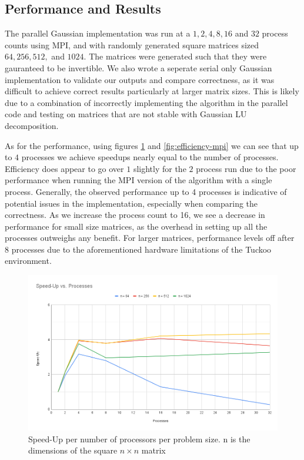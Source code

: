 \documentclass[12pt,letterpaper]{article}
\begin{document}
\subsection{Performance and Results}
    The parallel Gaussian implementation was run at a \(1, 2, 4, 8, 16\) and \(32\) process counts using MPI, and with randomly generated square matrices sized \(64, 256, 512,\) and \(1024\). The matrices were generated such that they were gauranteed to be invertible. We also wrote a seperate serial only Gaussian implementation to validate our outputs and compare correctness, as it was difficult to achieve correct results particularly at larger matrix sizes. This is likely due to a combination of incorrectly implementing the algorithm in the parallel code and testing on matrices that are not stable with Gaussian LU decomposition.
\par
    As for the performance, using figures \ref{fig:speed-up-mpi} and \ref{fig:efficiency-mpi} we can see that up to \(4\) processes we achieve speedups nearly equal to the number of processes. Efficiency does appear to go over \(1\) slightly for the \(2\) process run due to the poor performance when running the MPI version of the algorithm with a single process. Generally, the observed performance up to 4 processes is indicative of potential issues in the implementation, especially when comparing the correctness. As we increase the process count to 16, we see a decrease in performance for small size matrices, as the overhead in setting up all the processes outweighs any benefit. For larger matrices, performance levels off after 8 processes due to the aforementioned hardware limitations of the Tuckoo environment.
\pagebreak
\begin{figure}[!htb]
    \centering
    \includegraphics[width=0.9\linewidth]{"Speed-Up vs. Processes"}
    \caption{Speed-Up per number of processors per problem size. n is the dimensions of the square \(n \times n\) matrix}
    \label{fig:speed-up-mpi}
\end{figure}
\end{document}

